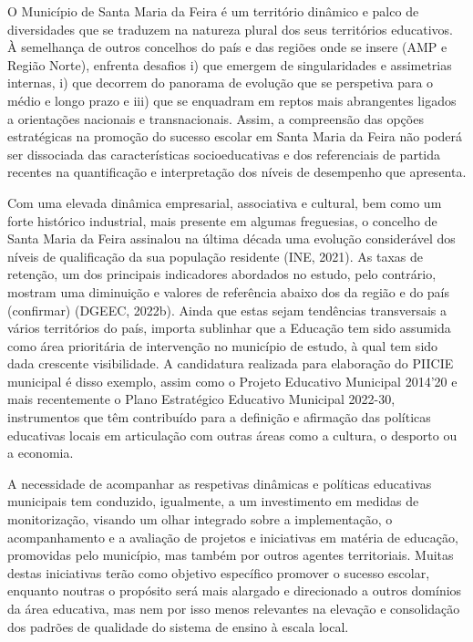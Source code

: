 \documentclass[
]{book}
\begin{document}
O Município de Santa Maria da Feira é um território dinâmico e palco de diversidades que se traduzem na natureza plural dos seus territórios educativos. À semelhança de outros concelhos do país e das regiões onde se insere (AMP e Região Norte), enfrenta desafios i) que emergem de singularidades e assimetrias internas, i) que decorrem do panorama de evolução que se perspetiva para o médio e longo prazo e iii) que se enquadram em reptos mais abrangentes ligados a orientações nacionais e transnacionais. Assim, a compreensão das opções estratégicas na promoção do sucesso escolar em Santa Maria da Feira não poderá ser dissociada das características socioeducativas e dos referenciais de partida recentes na quantificação e interpretação dos níveis de desempenho que apresenta.

Com uma elevada dinâmica empresarial, associativa e cultural, bem como um forte histórico industrial, mais presente em algumas freguesias, o concelho de Santa Maria da Feira assinalou na última década uma evolução considerável dos níveis de qualificação da sua população residente (INE, 2021). As taxas de retenção, um dos principais indicadores abordados no estudo, pelo contrário, mostram uma diminuição e valores de referência abaixo dos da região e do país (confirmar) (DGEEC, 2022b). Ainda que estas sejam tendências transversais a vários territórios do país, importa sublinhar que a Educação tem sido assumida como área prioritária de intervenção no município de estudo, à qual tem sido dada crescente visibilidade. A candidatura realizada para elaboração do PIICIE municipal é disso exemplo, assim como o Projeto Educativo Municipal 2014'20 e mais recentemente o Plano Estratégico Educativo Municipal 2022-30, instrumentos que têm contribuído para a definição e afirmação das políticas educativas locais em articulação com outras áreas como a cultura, o desporto ou a economia.

A necessidade de acompanhar as respetivas dinâmicas e políticas educativas municipais tem conduzido, igualmente, a um investimento em medidas de monitorização, visando um olhar integrado sobre a implementação, o acompanhamento e a avaliação de projetos e iniciativas em matéria de educação, promovidas pelo município, mas também por outros agentes territoriais. Muitas destas iniciativas terão como objetivo específico promover o sucesso escolar, enquanto noutras o propósito será mais alargado e direcionado a outros domínios da área educativa, mas nem por isso menos relevantes na elevação e consolidação dos padrões de qualidade do sistema de ensino à escala local.
\end{document}
